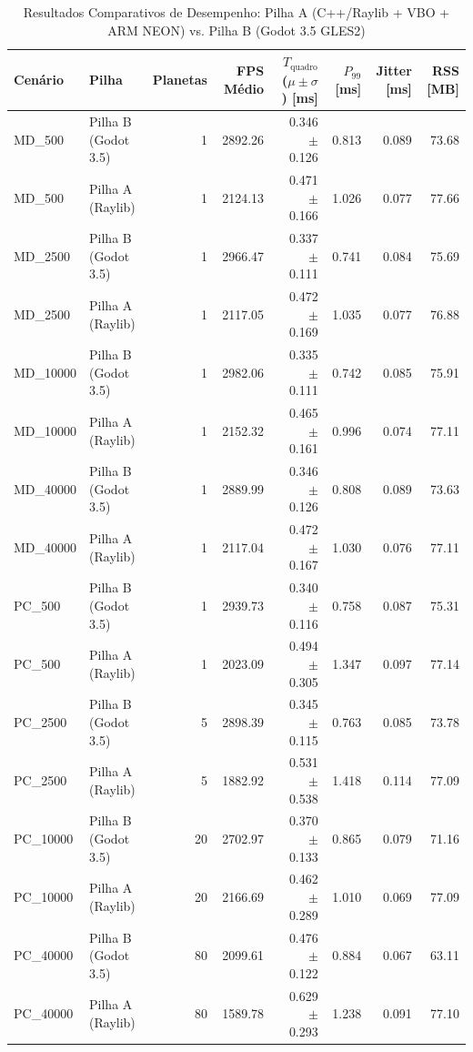 \begin{table}[t]
\centering
\caption{Resultados Comparativos de Desempenho: Pilha A (C++/Raylib + VBO + ARM NEON) vs. Pilha B (Godot 3.5 GLES2)}
\label{tab:resultados_benchmark}
\begin{tabular}{@{}llrrrrrr@{}}
\toprule
\textbf{Cenário} & \textbf{Pilha} & \textbf{Planetas} & \textbf{FPS Médio} & \textbf{$T_{\text{quadro}}$ ($\mu \pm \sigma$) [ms]} & \textbf{$P_{99}$ [ms]} & \textbf{Jitter [ms]} & \textbf{RSS [MB]} \\
\midrule
MD\_500 & Pilha B (Godot 3.5) & 1 & 2892.26 & 0.346 $\pm$ 0.126 & 0.813 & 0.089 & 73.68 \\
MD\_500 & Pilha A (Raylib) & 1 & 2124.13 & 0.471 $\pm$ 0.166 & 1.026 & 0.077 & 77.66 \\
MD\_2500 & Pilha B (Godot 3.5) & 1 & 2966.47 & 0.337 $\pm$ 0.111 & 0.741 & 0.084 & 75.69 \\
MD\_2500 & Pilha A (Raylib) & 1 & 2117.05 & 0.472 $\pm$ 0.169 & 1.035 & 0.077 & 76.88 \\
MD\_10000 & Pilha B (Godot 3.5) & 1 & 2982.06 & 0.335 $\pm$ 0.111 & 0.742 & 0.085 & 75.91 \\
MD\_10000 & Pilha A (Raylib) & 1 & 2152.32 & 0.465 $\pm$ 0.161 & 0.996 & 0.074 & 77.11 \\
MD\_40000 & Pilha B (Godot 3.5) & 1 & 2889.99 & 0.346 $\pm$ 0.126 & 0.808 & 0.089 & 73.63 \\
MD\_40000 & Pilha A (Raylib) & 1 & 2117.04 & 0.472 $\pm$ 0.167 & 1.030 & 0.076 & 77.11 \\
PC\_500 & Pilha B (Godot 3.5) & 1 & 2939.73 & 0.340 $\pm$ 0.116 & 0.758 & 0.087 & 75.31 \\
PC\_500 & Pilha A (Raylib) & 1 & 2023.09 & 0.494 $\pm$ 0.305 & 1.347 & 0.097 & 77.14 \\
PC\_2500 & Pilha B (Godot 3.5) & 5 & 2898.39 & 0.345 $\pm$ 0.115 & 0.763 & 0.085 & 73.78 \\
PC\_2500 & Pilha A (Raylib) & 5 & 1882.92 & 0.531 $\pm$ 0.538 & 1.418 & 0.114 & 77.09 \\
PC\_10000 & Pilha B (Godot 3.5) & 20 & 2702.97 & 0.370 $\pm$ 0.133 & 0.865 & 0.079 & 71.16 \\
PC\_10000 & Pilha A (Raylib) & 20 & 2166.69 & 0.462 $\pm$ 0.289 & 1.010 & 0.069 & 77.09 \\
PC\_40000 & Pilha B (Godot 3.5) & 80 & 2099.61 & 0.476 $\pm$ 0.122 & 0.884 & 0.067 & 63.11 \\
PC\_40000 & Pilha A (Raylib) & 80 & 1589.78 & 0.629 $\pm$ 0.293 & 1.238 & 0.091 & 77.10 \\
\bottomrule
\end{tabular}
\end{table}
